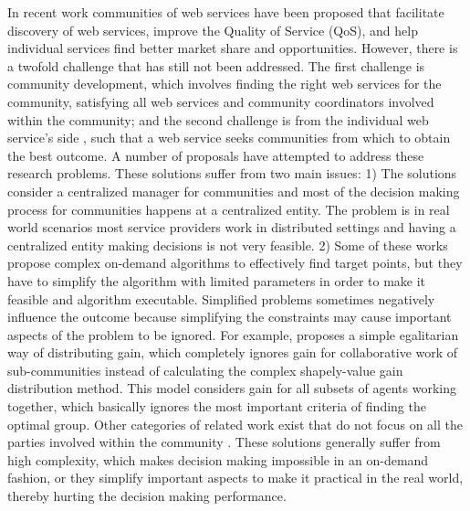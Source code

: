 \documentclass[10pt,journal,cspaper,compsoc]{IEEEtran}
\begin{document}
In recent work communities of web services have been proposed that facilitate discovery of web services, improve the Quality of Service (QoS), and help individual services find better market share and opportunities. However, there is a twofold challenge that has still not been addressed. The first challenge is community development, which involves finding the right web services for the community, satisfying all web services and community coordinators involved within the community; and the second challenge is from the individual web service's side , such that a web service seeks communities from which to obtain the best outcome. A number of proposals have attempted to address these research problems. These solutions suffer from two main issues: 1) The solutions consider a centralized manager for communities and most of the decision making process for communities happens at a centralized entity. The problem is in real world scenarios most service providers work in distributed settings and having a centralized entity making decisions is not very feasible. 2) Some of these works propose complex on-demand algorithms \cite{DBLP:conf/IEEEscc/LimTMB12, 10.1109/TSC.2012.12, 10.1109/TSC.2014.2312940} to effectively find target points, but they have to simplify the algorithm with limited parameters in order to make it feasible and algorithm executable. Simplified problems sometimes negatively influence the outcome because simplifying the constraints may cause important aspects of the problem to be ignored. For example, \cite{10.1109/TSC.2012.12} proposes a simple egalitarian way of distributing gain, which completely ignores gain for collaborative work of sub-communities instead of calculating the complex shapely-value gain distribution method. This model considers gain for all subsets of agents working together, which basically ignores the most important criteria of finding the optimal group. Other categories of related work exist that do not focus on all the parties involved within the community \cite{DBLP:conf/IEEEscc/KhosravifarABT11}. 
These solutions generally suffer from high complexity, which makes decision making impossible in an on-demand fashion, or they simplify important aspects to make it practical in the real world, thereby hurting the decision making performance. 
\end{document}
